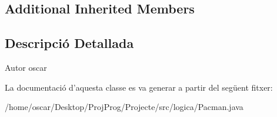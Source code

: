 \subsection*{Additional Inherited Members}


\subsection{Descripció Detallada}
\begin{DoxyAuthor}{Autor}
oscar 
\end{DoxyAuthor}


La documentació d'aquesta classe es va generar a partir del següent fitxer\+:\begin{DoxyCompactItemize}
\item 
/home/oscar/\+Desktop/\+Proj\+Prog/\+Projecte/src/logica/Pacman.\+java\end{DoxyCompactItemize}
